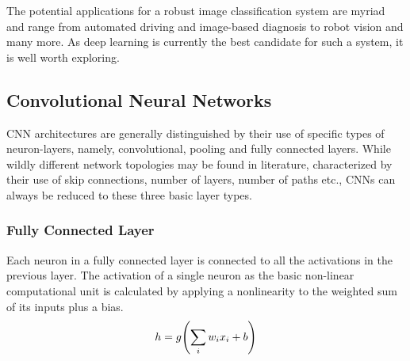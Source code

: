 The potential applications for a robust image classification system are myriad and range from automated driving and image-based diagnosis to robot vision and many more. As deep learning is currently the best candidate for such a system, it is well worth exploring.
\subsection{Convolutional Neural Networks}
CNN architectures are generally distinguished by their use of specific types of neuron-layers, namely, convolutional, pooling and fully connected layers. While wildly different network topologies may be found in literature, characterized by their use of skip connections, number of layers, number of paths etc., CNNs can always be reduced to these three basic layer types.
\subsubsection{Fully Connected Layer}
Each neuron in a fully connected layer is connected to all the activations in the previous layer. The activation of a single neuron as the basic non-linear computational unit is calculated by applying a nonlinearity to the weighted sum of its inputs plus a bias.
\begin{align}
    h = g\qty(\sum_i w_i x_i +b)
    \label{eq:neuron}
\end{align}
